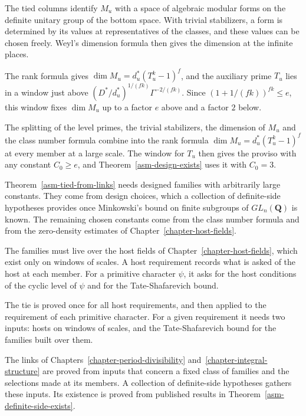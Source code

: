 The tied columns identify $M_u$ with a space of algebraic modular forms on the
definite unitary group of the bottom space. With trivial stabilizers, a form is
determined by its values at representatives of the classes, and these values
can be chosen freely. Weyl's dimension formula then gives the dimension at the
infinite places.

The rank formula gives $\dim M_u=d^*_u(T_u^k-1)^f$, and the auxiliary prime
$T_u$ lies in a window just above $(D^*/d^*_u)^{1/(fk)}\Gamma^{-2/(fk)}$. Since
$(1+1/(fk))^{fk}\le e$, this window fixes $\dim M_u$ up to a factor $e$ above
and a factor $2$ below.

The splitting of the level primes, the trivial stabilizers, the dimension of
$M_u$ and the class number formula combine into the rank formula
$\dim M_u=d^*_u(T_u^k-1)^f$ at every member at a large scale. The window for
$T_u$ then gives the proviso with any constant $C_0\ge e$, and
Theorem~\ref{asm-design-exists} uses it with $C_0=3$.

Theorem~\ref{asm-tied-from-links} needs designed families with arbitrarily
large constants. They come from design choices, which a collection of
definite-side hypotheses provides once Minkowski's bound on finite subgroups
of $GL_n(\mathbf Q)$ is known. The remaining chosen constants come from the
class number formula and from the zero-density estimates of
Chapter~\ref{chapter-host-fields}.

The families must live over the host fields of
Chapter~\ref{chapter-host-fields}, which exist only on windows of scales. A
host requirement records what is asked of the host at each member. For a
primitive character $\psi$, it asks for the host conditions of the cyclic
level of $\psi$ and for the Tate-Shafarevich bound.

The tie is proved once for all host requirements, and then applied to the
requirement of each primitive character. For a given requirement it needs two
inputs: hosts on windows of scales, and the Tate-Shafarevich bound for the
families built over them.

The links of Chapters~\ref{chapter-period-divisibility}
and~\ref{chapter-integral-structure} are proved from inputs that concern a
fixed class of families and the selections made at its members. A collection
of definite-side hypotheses gathers these inputs. Its existence is proved from
published results in Theorem~\ref{asm-definite-side-exists}.

